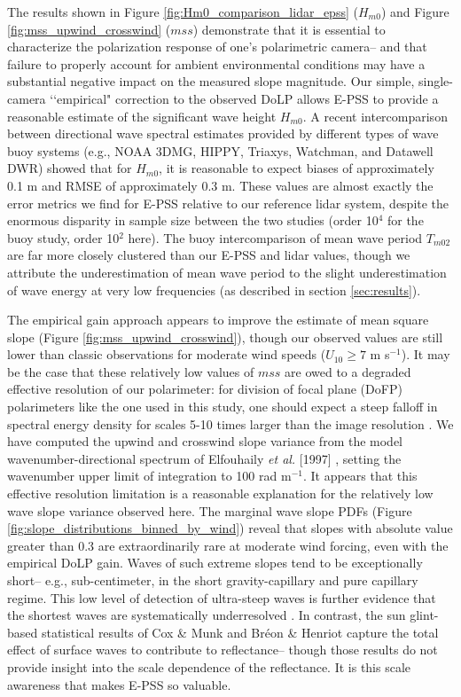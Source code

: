 \documentclass[letterpaper,journal]{IEEEtran}
\begin{document}
The results shown in Figure \ref{fig:Hm0_comparison_lidar_epss} ($H_{m0}$) and Figure \ref{fig:mss_upwind_crosswind} ($mss$) demonstrate that it is essential to characterize the polarization response of one's polarimetric camera-- and that failure to properly account for ambient environmental conditions may have a substantial negative impact on the measured slope magnitude. Our simple, single-camera \lq\lq empirical" correction to the observed DoLP allows E-PSS to provide a reasonable estimate of the significant wave height $H_{m0}$. A recent intercomparison \cite{jensen_quantifying_2021} between directional wave spectral estimates provided by different types of wave buoy systems (e.g., NOAA 3DMG, HIPPY, Triaxys, Watchman, and Datawell DWR) showed that for $H_{m0}$, it is reasonable to expect biases of approximately 0.1 m and RMSE of approximately 0.3 m. These values are almost exactly the error metrics we find for E-PSS relative to our reference lidar system, despite the enormous disparity in sample size between the two studies (order 10$^4$ for the buoy study, order 10$^2$ here). The buoy intercomparison of mean wave period $T_{m02}$ are far more closely clustered than our E-PSS and lidar values, though we attribute the underestimation of mean wave period to the slight underestimation of wave energy at very low frequencies (as described in section \ref{sec:results}).

The empirical gain approach appears to improve the estimate of mean square slope (Figure \ref{fig:mss_upwind_crosswind}), though our observed values are still lower than classic observations \cite{Cox1954a,Breon2006} for moderate wind speeds ($U_{10}\geq7$ m s$^{-1}$). It may be the case that these relatively low values of $mss$ are owed to a degraded effective resolution of our polarimeter: for division of focal plane (DoFP) polarimeters like the one used in this study, one should expect a steep falloff in spectral energy density for scales 5-10 times larger than the image resolution \cite{laxague_effects_2025}. We have computed the upwind and crosswind slope variance from the model wavenumber-directional spectrum of Elfouhaily \emph{et al.} [1997] \cite{Elfouhaily1997}, setting the wavenumber upper limit of integration to 100 rad m$^{-1}$. It appears that this effective resolution limitation \cite{laxague_effects_2025} is a reasonable explanation for the relatively low wave slope variance observed here. The marginal wave slope PDFs (Figure \ref{fig:slope_distributions_binned_by_wind}) reveal that slopes with absolute value greater than 0.3 are extraordinarily rare at moderate wind forcing, even with the empirical DoLP gain. Waves of such extreme slopes tend to be exceptionally short-- e.g., sub-centimeter, in the short gravity-capillary and pure capillary regime. This low level of detection of ultra-steep waves is further evidence that the shortest waves are systematically underresolved \cite{laxague_effects_2025}. In contrast, the sun glint-based statistical results of Cox \& Munk and Br\'eon \& Henriot capture the total effect of surface waves to contribute to reflectance-- though those results do not provide insight into the scale dependence of the reflectance. It is this scale awareness that makes E-PSS so valuable.
\end{document}
